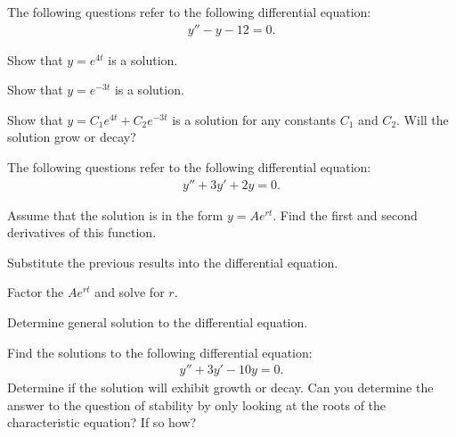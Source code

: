 

\begin{problem}
\item The following questions refer to the following differential
  equation:
  \begin{eqnarray*}
    y'' - y - 12 = 0.
  \end{eqnarray*}

  \begin{subproblem}
  \item Show that $y=e^{4t}$ is a solution.
    \vspace{4cm}
  \item Show that $y=e^{-3t}$ is a solution.
    \vspace{4cm}
  \item Show that $y=C_1 e^{4t} + C_2 e^{-3t}$ is a solution for
    any constants $C_1$ and $C_2$. Will the solution grow or
    decay?

    \vfill

  \end{subproblem}

\end{problem}


  \begin{problem}

  \item The following questions refer to the following differential
    equation:
    \begin{eqnarray*}
      y'' + 3 y' + 2 y = 0.
    \end{eqnarray*}
    \begin{subproblem}
    \item Assume that the solution is in the form $y=Ae^{rt}$. Find
      the first and second derivatives of this function.
      \vfill

    \item Substitute the previous results into the differential equation.
      \vfill
      
    \item Factor the $Ae^{rt}$ and solve for $r$.
      \vfill

    \item Determine general solution to the differential equation.
      \vfill
    
    \end{subproblem}


 
    \clearpage
  \item Find the solutions to the following differential equation:
    \begin{eqnarray*}
      y'' + 3y' - 10y = 0.
    \end{eqnarray*}
    Determine if the solution will exhibit growth or decay. Can you
    determine the answer to the question of stability by only looking
    at the roots of the characteristic equation? If so how?

    \vfill
  \end{problem}


